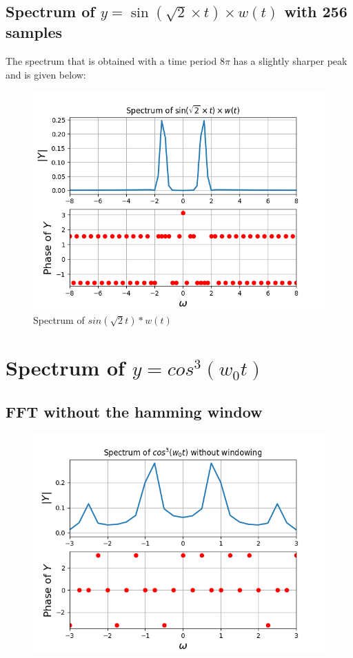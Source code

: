 \documentclass{article}
\begin{document}
\subsection{Spectrum of $y=\sin\left(\sqrt{2}\times t\right)\times w(t)$ with 256 samples}

The spectrum that is obtained with a time period $8\pi$ has a slightly sharper peak and is given below:
\begin{figure}[h!]
\centering
\includegraphics[scale=0.5]{Figure_7.png}
\caption{Spectrum of $sin(\sqrt{2}t)*w(t)$}
\label{fig:universe}
\end{figure}

\newpage

\section{Spectrum of $y = cos^3(w_0t)$}

\subsection{FFT without the hamming window}
\begin{figure}[h!]
\centering
\includegraphics[scale=0.5]{Figure_8.png}
\label{fig:universe}
\end{figure}
\end{document}
